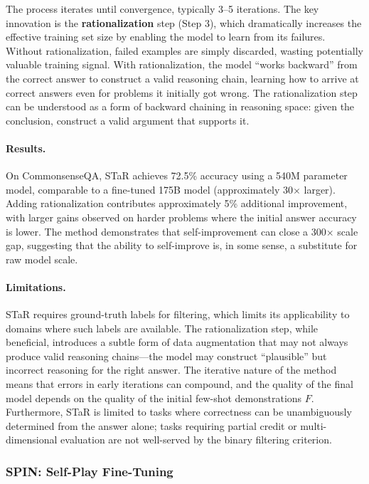 The process iterates until convergence, typically 3--5 iterations. The key innovation is the \textbf{rationalization} step (Step 3), which dramatically increases the effective training set size by enabling the model to learn from its failures. Without rationalization, failed examples are simply discarded, wasting potentially valuable training signal. With rationalization, the model ``works backward'' from the correct answer to construct a valid reasoning chain, learning how to arrive at correct answers even for problems it initially got wrong. The rationalization step can be understood as a form of backward chaining in reasoning space: given the conclusion, construct a valid argument that supports it.

\paragraph{Results.}
On CommonsenseQA, STaR achieves 72.5\% accuracy using a 540M parameter model, comparable to a fine-tuned 175B model (approximately 30$\times$ larger). Adding rationalization contributes approximately 5\% additional improvement, with larger gains observed on harder problems where the initial answer accuracy is lower. The method demonstrates that self-improvement can close a 300$\times$ scale gap, suggesting that the ability to self-improve is, in some sense, a substitute for raw model scale.

\paragraph{Limitations.}
STaR requires ground-truth labels for filtering, which limits its applicability to domains where such labels are available. The rationalization step, while beneficial, introduces a subtle form of data augmentation that may not always produce valid reasoning chains---the model may construct ``plausible'' but incorrect reasoning for the right answer. The iterative nature of the method means that errors in early iterations can compound, and the quality of the final model depends on the quality of the initial few-shot demonstrations $F$. Furthermore, STaR is limited to tasks where correctness can be unambiguously determined from the answer alone; tasks requiring partial credit or multi-dimensional evaluation are not well-served by the binary filtering criterion.


\subsubsection{SPIN: Self-Play Fine-Tuning}
\label{sec:spin}

